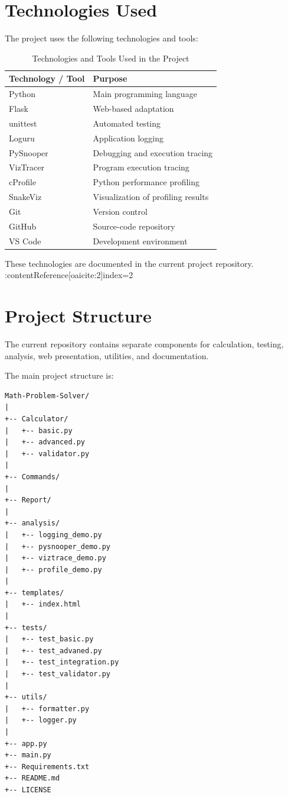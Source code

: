 \documentclass[12pt,a4paper]{report}
\begin{document}
\section{Technologies Used}

The project uses the following technologies and tools:

\begin{table}[H]
\centering
\caption{Technologies and Tools Used in the Project}
\begin{tabular}{p{4cm}p{8cm}}
\toprule
\textbf{Technology / Tool} & \textbf{Purpose} \\
\midrule
Python & Main programming language \\
Flask & Web-based adaptation \\
unittest & Automated testing \\
Loguru & Application logging \\
PySnooper & Debugging and execution tracing \\
VizTracer & Program execution tracing \\
cProfile & Python performance profiling \\
SnakeViz & Visualization of profiling results \\
Git & Version control \\
GitHub & Source-code repository \\
VS Code & Development environment \\
\bottomrule
\end{tabular}
\end{table}

These technologies are documented in the current project repository. :contentReference[oaicite:2]{index=2}

\section{Project Structure}

The current repository contains separate components for calculation,
testing, analysis, web presentation, utilities, and documentation.

The main project structure is:

\begin{lstlisting}
Math-Problem-Solver/
|
+-- Calculator/
|   +-- basic.py
|   +-- advanced.py
|   +-- validator.py
|
+-- Commands/
|
+-- Report/
|
+-- analysis/
|   +-- logging_demo.py
|   +-- pysnooper_demo.py
|   +-- viztrace_demo.py
|   +-- profile_demo.py
|
+-- templates/
|   +-- index.html
|
+-- tests/
|   +-- test_basic.py
|   +-- test_advaned.py
|   +-- test_integration.py
|   +-- test_validator.py
|
+-- utils/
|   +-- formatter.py
|   +-- logger.py
|
+-- app.py
+-- main.py
+-- Requirements.txt
+-- README.md
+-- LICENSE
\end{lstlisting}
\end{document}
